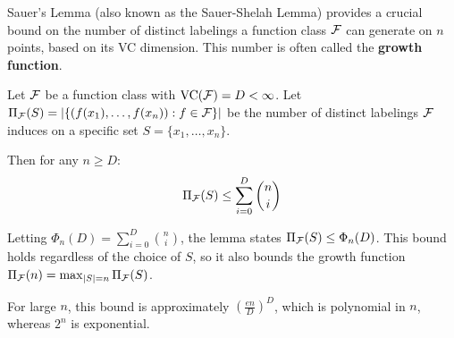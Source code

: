 Sauer's Lemma (also known as the Sauer-Shelah Lemma) provides a crucial bound on the number of distinct labelings a function class $\mathcal{F}$ can generate on $n$ points, based on its VC dimension. This number is often called the \textbf{growth function}.

\begin{lem}
Let $\mathcal{F}$ be a function class with $\text{VC}(\mathcal{F}) = D < \infty$. Let $\Pi_{\mathcal{F}}(S) = |\{ (f(x_1), \dots, f(x_n)) : f \in \mathcal{F} \}|$ be the number of distinct labelings $\mathcal{F}$ induces on a specific set $S = \{x_1, \dots, x_n\}$.

Then for any $n \ge D$:
$$
\Pi_{\mathcal{F}}(S) \le \sum_{i=0}^D \binom{n}{i}
$$
\end{lem}

\begin{remark}
    Letting $\Phi_n(D) = \sum_{i=0}^D \binom{n}{i}$, the lemma states $\Pi_{\mathcal{F}}(S) \le \Phi_n(D)$.
This bound holds regardless of the choice of $S$, so it also bounds the growth function $\Pi_{\mathcal{F}}(n) = \max_{|S|=n} \Pi_{\mathcal{F}}(S)$.

For large $n$, this bound is approximately $\left( \frac{en}{D} \right)^D$, which is polynomial in $n$, whereas $2^n$ is exponential.
\end{remark}
